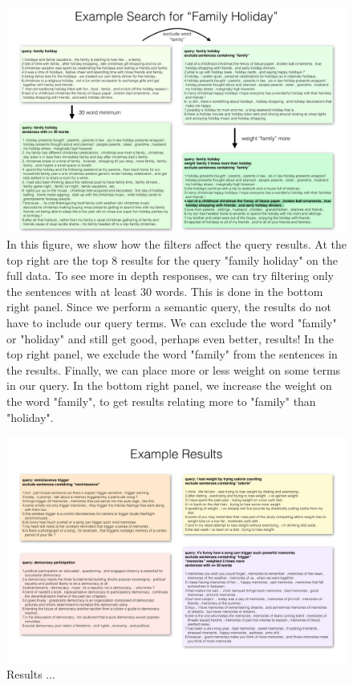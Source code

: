 \documentclass{sigchi}
\begin{document}

\begin{figure}[h!]
\centering \includegraphics[width=\textwidth]{figures/results_1} 
\caption{In this figure, we show how the filters affect the query results. 
At the top right are the top 8 results for the query "family holiday" on the full data.  
To see more in depth responses, we can try filtering only the sentences with at least 30 words. 
This is done in the bottom right panel. 
Since we perform a semantic query, the results do not have to include our query terms. 
We can exclude the word "family" or "holiday" and still get good, perhaps even better, results! 
In the top right panel, we exclude the word "family" from the sentences in the results.
Finally, we can place more or less weight on some terms in our query. 
In the bottom right panel, we increase the weight on the word "family", 
to get results relating more to "family" than "holiday".
}
\end{figure}

\begin{figure}[h!]
\centering \includegraphics[width=\textwidth]{figures/results_2} 
\caption{Results ... }
\end{figure}
\end{document}
